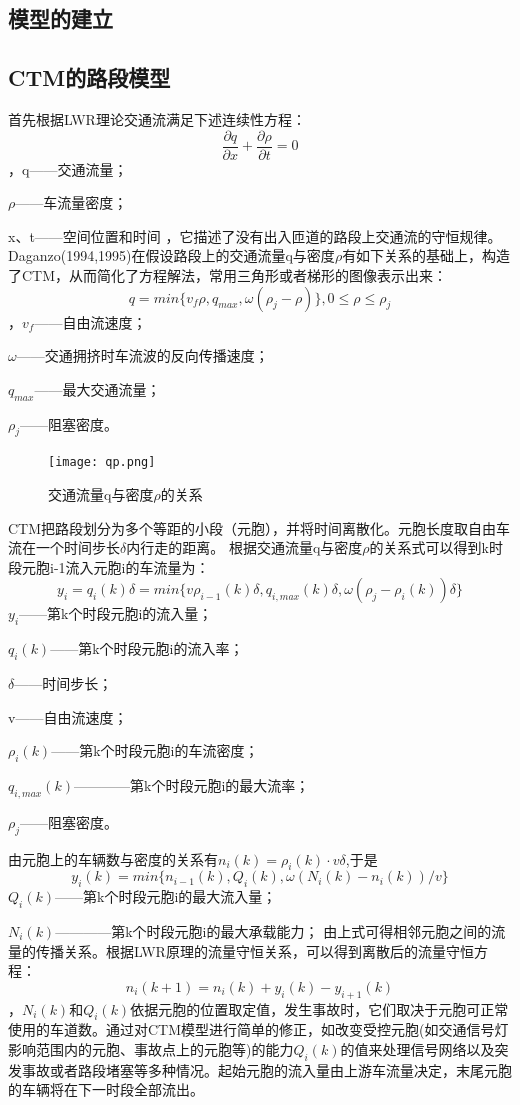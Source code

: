 \documentclass[UTF8,12.05pt]{ctexart}
\begin{document}
\subsection{模型的建立}
\subsection{CTM的路段模型}
首先根据LWR理论交通流满足下述连续性方程：
$$\frac{\partial q}{\partial x}+\frac{\partial \rho}{\partial t}=0$$
，q——交通流量；
\par$\rho$——车流量密度；
\par x、t——空间位置和时间
，它描述了没有出入匝道的路段上交通流的守恒规律。Daganzo(1994,1995)在假设路段上的交通流量q与密度$\rho$有如下关系的基础上，构造了CTM，从而简化了方程解法，常用三角形或者梯形的图像表示出来：
$$q=min\{v_{f}\rho,q_{max},\omega(\rho_{j}-\rho)\},     0\leq\rho\leq\rho_{j}$$
，$v_{f}$——自由流速度；
\par$\omega$——交通拥挤时车流波的反向传播速度；
\par$q_{max}$——最大交通流量；
\par$\rho_{j}$——阻塞密度。
\begin{figure}[H]
  \centering
  \texttt{[image: qp.png]}
  \caption{交通流量q与密度$\rho$的关系}
\end{figure}
\par CTM把路段划分为多个等距的小段（元胞），并将时间离散化。元胞长度取自由车流在一个时间步长$\delta$内行走的距离。
根据交通流量q与密度$\rho$的关系式可以得到k时段元胞i-1流入元胞i的车流量为：
$$y_{i}=q_{i}(k)\delta=min\{v\rho_{i-1}(k)\delta,q_{i,max}(k)\delta,\omega(\rho_{j}-\rho_{i}(k))\delta\}$$
$y_{i}$——第k个时段元胞i的流入量；
\par$q_{i}(k)$——第k个时段元胞i的流入率；
\par$\delta$——时间步长；
\par v——自由流速度；
\par $\rho_{i}(k)$——第k个时段元胞i的车流密度；
\par $q_{i,max}(k)$————第k个时段元胞i的最大流率；
\par $\rho_{j}$——阻塞密度。
\par 由元胞上的车辆数与密度的关系有$n_{i}(k)=\rho_{i}(k)\cdot v\delta$,于是
$$y_{i}(k)=min\{n_{i-1}(k),Q_{i}(k),\omega(N_{i}(k)-n_{i}(k))/v\}$$
$Q_{i}(k)$——第k个时段元胞i的最大流入量；
\par $N_{i}(k)$————第k个时段元胞i的最大承载能力；
由上式可得相邻元胞之间的流量的传播关系。根据LWR原理的流量守恒关系，可以得到离散后的流量守恒方程：
$$n_{i}(k+1)=n_{i}(k)+y_{i}(k)-y_{i+1}(k)$$
，$N_{i}(k)$和$Q_{i}(k)$依据元胞的位置取定值，发生事故时，它们取决于元胞可正常使用的车道数。通过对CTM模型进行简单的修正，如改变受控元胞(如交通信号灯影响范围内的元胞、事故点上的元胞等)的能力$Q_{i}(k)$的值来处理信号网络以及突发事故或者路段堵塞等多种情况。起始元胞的流入量由上游车流量决定，末尾元胞的车辆将在下一时段全部流出。
\end{document}
